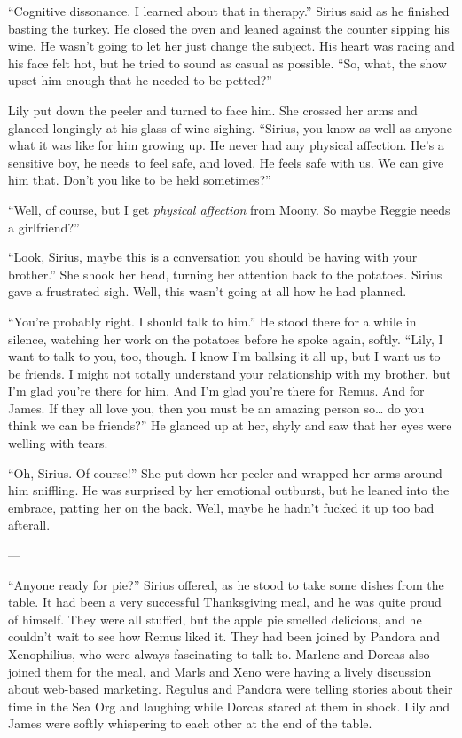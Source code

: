\documentclass[12pt,twoside,openright]{memoir}
\begin{document}
``Cognitive dissonance. I learned about that in therapy.'' Sirius said as he finished basting the turkey. He closed the oven and leaned against the counter sipping his wine. He wasn't going to let her just change the subject. His heart was racing and his face felt hot, but he tried to sound as casual as possible. ``So, what, the show upset him enough that he needed to be petted?''

Lily put down the peeler and turned to face him. She crossed her arms and glanced longingly at his glass of wine sighing. ``Sirius, you know as well as anyone what it was like for him growing up. He never had any physical affection. He's a sensitive boy, he needs to feel safe, and loved. He feels safe with us. We can give him that. Don't you like to be held sometimes?''

``Well, of course, but I get \textit{physical affection} from Moony. So maybe Reggie needs a girlfriend?'' 

``Look, Sirius, maybe this is a conversation you should be having with your brother.'' She shook her head, turning her attention back to the potatoes. Sirius gave a frustrated sigh. Well, this wasn't going at all how he had planned. 

``You're probably right. I should talk to him.'' He stood there for a while in silence, watching her work on the potatoes before he spoke again, softly. ``Lily, I want to talk to you, too, though. I know I'm ballsing it all up, but I want us to be friends. I might not totally understand your relationship with my brother, but I'm glad you're there for him. And I'm glad you're there for Remus. And for James. If they all love you, then you must be an amazing person so… do you think we can be friends?'' He glanced up at her, shyly and saw that her eyes were welling with tears.

``Oh, Sirius. Of course!'' She put down her peeler and wrapped her arms around him sniffling. He was surprised by her emotional outburst, but he leaned into the embrace, patting her on the back. Well, maybe he hadn't fucked it up too bad afterall.

---

``Anyone ready for pie?'' Sirius offered, as he stood to take some dishes from the table. It had been a very successful Thanksgiving meal, and he was quite proud of himself. They were all stuffed, but the apple pie smelled delicious, and he couldn't wait to see how Remus liked it. They had been joined by Pandora and Xenophilius, who were always fascinating to talk to. Marlene and Dorcas also joined them for the meal, and Marls and Xeno were having a lively discussion about web-based marketing. Regulus and Pandora were telling stories about their time in the Sea Org and laughing while Dorcas stared at them in shock. Lily and James were softly whispering to each other at the end of the table.
\end{document}
